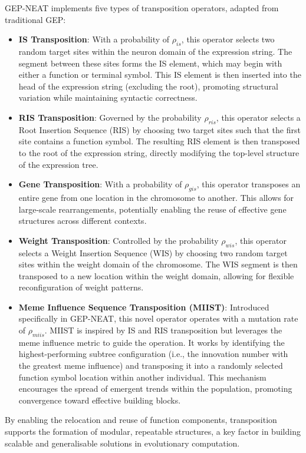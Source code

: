 \parbreak\noindent GEP-NEAT implements five types of transposition operators, adapted from traditional GEP:
\begin{itemize}
	\item \textbf{IS Transposition}: With a probability of $\rho_{is}$, this operator selects two random target sites within the neuron domain of the expression string. The segment between these sites forms the IS element, which may begin with either a function or terminal symbol. This IS element is then inserted into the head of the expression string (excluding the root), promoting structural variation while maintaining syntactic correctness.
	\item \textbf{RIS Transposition}: Governed by the probability $\rho_{ris}$, this operator selects a Root Insertion Sequence (RIS) by choosing two target sites such that the first site contains a function symbol. The resulting RIS element is then transposed to the root of the expression string, directly modifying the top-level structure of the expression tree.
	\item \textbf{Gene Transposition}: With a probability of $\rho_{gis}$, this operator transposes an entire gene from one location in the chromosome to another. This allows for large-scale rearrangements, potentially enabling the reuse of effective gene structures across different contexts.
	\item \textbf{Weight Transposition}: Controlled by the probability $\rho_{wis}$, this operator selects a Weight Insertion Sequence (WIS) by choosing two random target sites within the weight domain of the chromosome. The WIS segment is then transposed to a new location within the weight domain, allowing for flexible reconfiguration of weight patterns.
	\item \textbf{Meme Influence Sequence Transposition (MIIST)}: Introduced specifically in GEP-NEAT, this novel operator operates with a mutation rate of $\rho_{miis}$. MIIST is inspired by IS and RIS transposition but leverages the meme influence metric to guide the operation. It works by identifying the highest-performing subtree configuration (i.e., the innovation number with the greatest meme influence) and transposing it into a randomly selected function symbol location within another individual. This mechanism encourages the spread of emergent trends within the population, promoting convergence toward effective building blocks.
\end{itemize}

\parbreak\noindent By enabling the relocation and reuse of function components, transposition supports the formation of modular, repeatable structures, a key factor in building scalable and generalisable solutions in evolutionary computation.


